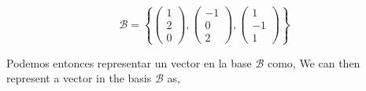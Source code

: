 \begin{equation*}
\mathcal{B}=\left\lbrace \begin{pmatrix}
1\\
2\\
0
\end{pmatrix}, \begin{pmatrix}
-1\\
0\\
2
\end{pmatrix}, \begin{pmatrix}
1\\
-1\\
1
\end{pmatrix} \right\rbrace
\end{equation*} 
\begin{paracol}{2}
Podemos entonces representar un vector en la base $\mathcal{B}$ como,
\switchcolumn
We can then represent a vector in the basis $\mathcal{B}$ as,
\end{paracol}

